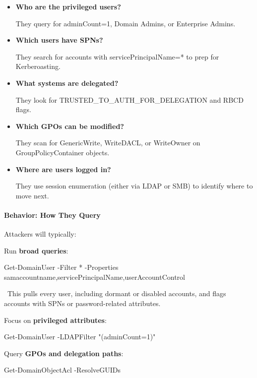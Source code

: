 {{\begin{itemize}
    \item \textbf{Who are the privileged users?}

 They query for adminCount=1, Domain Admins, or Enterprise Admins.

    \item \textbf{Which users have SPNs?}

 They search for accounts with servicePrincipalName=* to prep for Kerberoasting.

    \item \textbf{What systems are delegated?}

 They look for TRUSTED\_TO\_AUTH\_FOR\_DELEGATION and RBCD flags.

    \item \textbf{Which GPOs can be modified?}

 They scan for GenericWrite, WriteDACL, or WriteOwner on GroupPolicyContainer objects.

    \item \textbf{Where are users logged in?}

 They use session enumeration (either via LDAP or SMB) to identify where to move next.

\end{itemize}

\paragraph{\textbf{   Behavior: How They Query}}

Attackers will typically:

Run \textbf{broad queries}:

  

 

Get-DomainUser -Filter * -Properties samaccountname,servicePrincipalName,userAccountControl

 This pulls every user, including dormant or disabled accounts, and flags accounts with SPNs or password-related attributes.

Focus on \textbf{privileged attributes}:

  

 

Get-DomainUser -LDAPFilter "(adminCount=1)"

Query \textbf{GPOs and delegation paths}:

  

 

Get-DomainObjectAcl -ResolveGUIDs

}}
